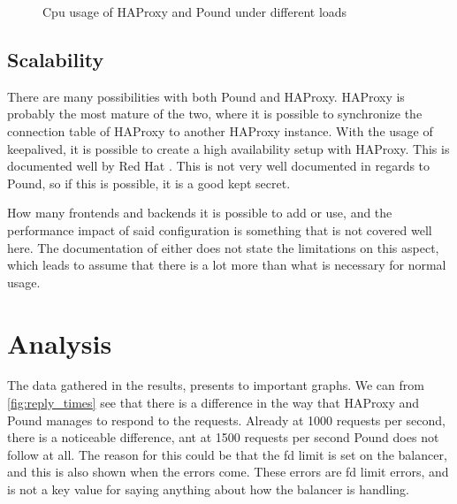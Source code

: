 \begin{figure}[H]
\centering
{}
\caption{\label{fig:cpu_usage}Cpu usage of HAProxy and Pound under different
loads}
\end{figure}

\subsection{Scalability}
There are many possibilities with both Pound and HAProxy. HAProxy is probably
the most mature of the two, where it is possible to synchronize the connection
table of HAProxy to another HAProxy instance. With the usage of keepalived, it
is possible to create a high availability setup with HAProxy. This is
documented well by Red Hat \cite{redhat:haproxy}.
This is not very well documented in regards to Pound, so if this is possible,
it is a good kept secret.

How many frontends and backends it is possible to add or use, and the
performance impact of said configuration is something that is not covered well
here. The documentation of either does not state the limitations on this
aspect, which leads to assume that there is a lot more than what is necessary
for normal usage.




\section{Analysis}
 The data gathered in the results, presents to important graphs. We can from
 \vref{fig:reply_times} see that there is a difference in the way that HAProxy
 and Pound manages to respond to the requests. Already at 1000 requests per
 second, there is a noticeable difference, ant at 1500 requests per second
 Pound does not follow at all. The reason for this could be that the fd limit
 is set on the balancer, and this is also shown when the errors come. These
 errors are fd limit errors, and is not a key value for saying anything about
 how the balancer is handling. 


